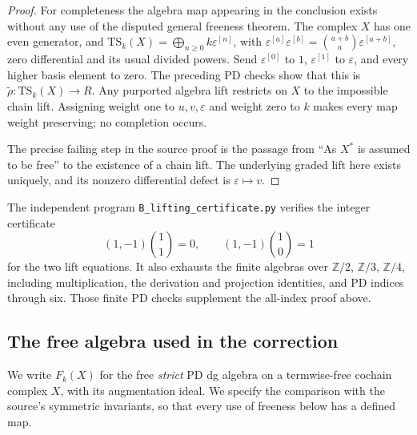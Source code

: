 \begin{proof}
For completeness the algebra map appearing in the conclusion exists
without any use of the disputed general freeness theorem.  The complex
$X$ has one even generator, and
$\mathrm{TS}_k(X)=\bigoplus_{n\geq0}k\varepsilon^{[n]}$, with
$\varepsilon^{[a]}\varepsilon^{[b]}=\binom{a+b}{a}\varepsilon^{[a+b]}$,
zero differential and its usual divided powers.
Send $\varepsilon^{[0]}$ to $1$, $\varepsilon^{[1]}$ to $\varepsilon$,
and every higher basis element to zero.  The preceding PD checks show
that this is $\widetilde\rho:\mathrm{TS}_k(X)\to R$.
Any purported algebra lift restricts on $X$ to the impossible chain lift.
Assigning weight one to $u,v,\varepsilon$ and weight zero to $k$ makes
every map weight preserving; no completion occurs.

The precise failing step in the source proof is the passage from
``As $X^*$ is assumed to be free'' to the existence of a chain lift.
The underlying graded lift here exists uniquely, and its nonzero
differential defect is $\varepsilon\mapsto v$.
\end{proof}

The independent program \texttt{B\_lifting\_certificate.py} verifies
the integer certificate
\[
(1,-1)\binom{1}{1}=0,\qquad (1,-1)\binom{1}{0}=1
\]
for the two lift equations.  It also exhausts the finite algebras over
$\mathbb Z/2$, $\mathbb Z/3$, $\mathbb Z/4$, including multiplication,
the derivation and projection identities, and PD indices through six.
Those finite PD checks supplement the all-index proof above.

\subsection{The free algebra used in the correction}

We write $F_k(X)$ for the free \emph{strict} PD dg algebra on a
termwise-free cochain complex $X$, with its augmentation ideal.
We specify the comparison with the source's symmetric invariants, so
that every use of freeness below has a defined map.


